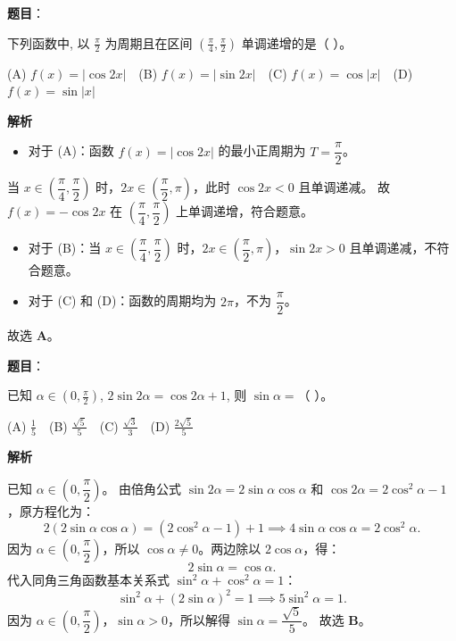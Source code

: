 \begin{answer}

\textbf{题目}：

下列函数中, 以 $\frac{\pi}{2}$ 为周期且在区间 $(\frac{\pi}{4}, \frac{\pi}{2})$ 单调递增的是（ ）。

(A) $f(x) = |\cos 2x|$　(B) $f(x) = |\sin 2x|$　(C) $f(x) = \cos |x|$　(D) $f(x) = \sin |x|$

\textbf{解析}

\begin{itemize}
\item 对于 (A)：函数 $f(x) = |\cos 2x|$ 的最小正周期为 $T = \dfrac{\pi}{2}$。
\end{itemize}
  当 $x \in \left(\dfrac{\pi}{4}, \dfrac{\pi}{2}\right)$ 时，$2x \in \left(\dfrac{\pi}{2}, \pi\right)$，此时 $\cos 2x < 0$ 且单调递减。
  故 $f(x) = -\cos 2x$ 在 $\left(\dfrac{\pi}{4}, \dfrac{\pi}{2}\right)$ 上单调递增，符合题意。
\begin{itemize}
\item 对于 (B)：当 $x \in \left(\dfrac{\pi}{4}, \dfrac{\pi}{2}\right)$ 时，$2x \in \left(\dfrac{\pi}{2}, \pi\right)$，$\sin 2x > 0$ 且单调递减，不符合题意。
\item 对于 (C) 和 (D)：函数的周期均为 $2\pi$，不为 $\dfrac{\pi}{2}$。
\end{itemize}
故选 \textbf{A}。


\end{answer}
\begin{answer}

\textbf{题目}：

已知 $\alpha \in (0, \frac{\pi}{2})$, $2\sin 2\alpha = \cos 2\alpha + 1$, 则 $\sin\alpha =$（ ）。

(A) $\frac{1}{5}$　(B) $\frac{\sqrt{5}}{5}$　(C) $\frac{\sqrt{3}}{3}$　(D) $\frac{2\sqrt{5}}{5}$

\textbf{解析}

已知 $\alpha \in \left(0, \dfrac{\pi}{2}\right)$。
由倍角公式 $\sin 2\alpha = 2\sin\alpha\cos\alpha$ 和 $\cos 2\alpha = 2\cos^2\alpha - 1$，原方程化为：
\nopagebreak[4]
\[2(2\sin\alpha\cos\alpha) = (2\cos^2\alpha - 1) + 1 \implies 4\sin\alpha\cos\alpha = 2\cos^2\alpha.\]
因为 $\alpha \in \left(0, \dfrac{\pi}{2}\right)$，所以 $\cos\alpha \neq 0$。两边除以 $2\cos\alpha$，得：
\nopagebreak[4]
\[2\sin\alpha = \cos\alpha.\]
代入同角三角函数基本关系式 $\sin^2\alpha + \cos^2\alpha = 1$：
\nopagebreak[4]
\[\sin^2\alpha + (2\sin\alpha)^2 = 1 \implies 5\sin^2\alpha = 1.\]
因为 $\alpha \in \left(0, \dfrac{\pi}{2}\right)$，$\sin\alpha > 0$，所以解得 $\sin\alpha = \dfrac{\sqrt{5}}{5}$。
故选 \textbf{B}。


\end{answer}
